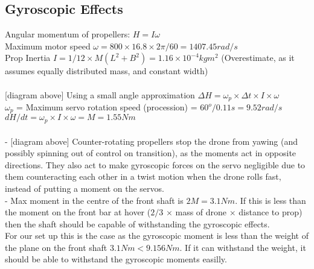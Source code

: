 \label{sec:AppA}

\subsection{Gyroscopic Effects}
Angular momentum of propellers: $H = I\omega$\\
Maximum motor speed $\omega = 800\times16.8\times2\pi/60 = 1407.45rad/s$\\
Prop Inertia $I = 1/12\times M(L^2+B^2) = 1.16\times10^{-4}kgm^2$ (Overestimate, as it assumes equally distributed mass, and constant width)\\\\

[diagram above] Using a small angle approximation $\Delta H = \omega_p \times\Delta t \times I \times \omega$\\ 
$\omega_p$ = Maximum servo rotation speed (procession) = $60^o/0.11s = 9.52rad/s$\\
$dH/dt = \omega_p \times I \times \omega = M = 1.55Nm$\\\\

- [diagram above] Counter-rotating propellers stop the drone from yawing (and possibly spinning out of control on transition), as the moments act in opposite directions. They also act to make gyroscopic forces on the servo negligible due to them counteracting each other in a twist motion when the drone rolls fast, instead of putting a moment on the servos.\\
- Max moment in the centre of the front shaft is $2M = 3.1Nm$. If this is less than the moment on the front bar at hover ($2/3$ $\times $ mass of drone $\times$ distance to prop) then the shaft should be capable of withstanding the gyroscopic effects.\\
For our set up this is the case as the gyroscopic moment is less than the weight of the plane on the front shaft $3.1Nm < 9.156Nm$. If it can withstand the weight, it should be able to withstand the gyroscopic moments easilly.


